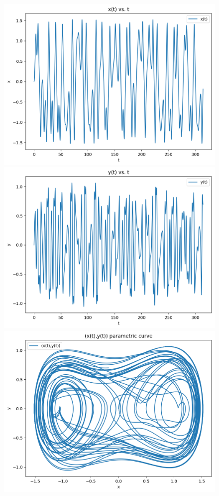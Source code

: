 \documentclass{article}
\begin{document}
\begin{figure}[h!]
\includegraphics[scale=0.4]{x(t)7.png}
\includegraphics[scale=0.4]{y(t)7.png}
\includegraphics[scale=0.4]{parametriccurve7.png}

\end{figure}
\end{document}

